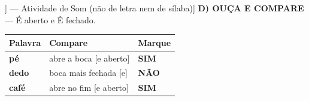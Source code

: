 \begin{exercicio}[Som /é/ aberto [[E]] --- Atividade de Som (não de letra nem de sílaba)]
\textbf{D) OUÇA E COMPARE} --- É aberto e Ê fechado.

\begin{center}
\begin{tabular}{@{}p{4.2cm}p{6.2cm}p{1.6cm}@{}}
\hline
\textbf{Palavra} & \textbf{Compare} & \textbf{Marque} \\
\hline
\textbf{pé} & abre a boca [e aberto] & \textbf{SIM} \\
\textbf{dedo} & boca mais fechada [e] & \textbf{NÃO} \\
\textbf{café} & abre no fim [e aberto] & \textbf{SIM} \\
\hline
\end{tabular}
\end{center}

\end{exercicio}

